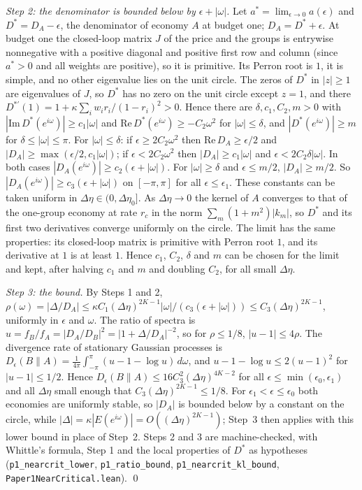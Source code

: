 \documentclass[12pt]{article}
\theoremstyle{definition}
\theoremstyle{remark}
\begin{document}
\emph{Step 2: the denominator is bounded below by $\epsilon+|\omega|$.} Let $a^*=\lim_{\epsilon\to0}a(\epsilon)$ and $D^*=D_A-\epsilon$, the denominator of economy $A$ at budget one; $D_A=D^*+\epsilon$. At budget one the closed-loop matrix $J$ of the price and the groups is entrywise nonnegative with a positive diagonal and positive first row and column (since $a^*>0$ and all weights are positive), so it is primitive. Its Perron root is $1$, it is simple, and no other eigenvalue lies on the unit circle. The zeros of $D^*$ in $|z|\ge1$ are eigenvalues of $J$, so $D^*$ has no zero on the unit circle except $z=1$, and there $D^{*\prime}(1)=1+\kappa\sum_iw_ir_i/(1-r_i)^2>0$. Hence there are $\delta,c_1,C_2,m>0$ with $|\mathrm{Im}\,D^*(e^{i\omega})|\ge c_1|\omega|$ and $\mathrm{Re}\,D^*(e^{i\omega})\ge-C_2\omega^2$ for $|\omega|\le\delta$, and $|D^*(e^{i\omega})|\ge m$ for $\delta\le|\omega|\le\pi$. For $|\omega|\le\delta$: if $\epsilon\ge2C_2\omega^2$ then $\mathrm{Re}\,D_A\ge\epsilon/2$ and $|D_A|\ge\max(\epsilon/2,c_1|\omega|)$; if $\epsilon<2C_2\omega^2$ then $|D_A|\ge c_1|\omega|$ and $\epsilon<2C_2\delta|\omega|$. In both cases $|D_A(e^{i\omega})|\ge c_2(\epsilon+|\omega|)$. For $|\omega|\ge\delta$ and $\epsilon\le m/2$, $|D_A|\ge m/2$. So $|D_A(e^{i\omega})|\ge c_3(\epsilon+|\omega|)$ on $[-\pi,\pi]$ for all $\epsilon\le\epsilon_1$. These constants can be taken uniform in $\Delta\eta\in(0,\Delta\eta_0]$. As $\Delta\eta\to0$ the kernel of $A$ converges to that of the one-group economy at rate $r_c$ in the norm $\sum_m(1+m^2)|k_m|$, so $D^*$ and its first two derivatives converge uniformly on the circle. The limit has the same properties: its closed-loop matrix is primitive with Perron root $1$, and its derivative at $1$ is at least $1$. Hence $c_1$, $C_2$, $\delta$ and $m$ can be chosen for the limit and kept, after halving $c_1$ and $m$ and doubling $C_2$, for all small $\Delta\eta$.

\emph{Step 3: the bound.} By Steps 1 and 2, $\rho(\omega)=|\Delta/D_A|\le\kappa C_1(\Delta\eta)^{2K-1}|\omega|/(c_3(\epsilon+|\omega|))\le C_3(\Delta\eta)^{2K-1}$, uniformly in $\epsilon$ and $\omega$. The ratio of spectra is $u=f_B/f_A=|D_A/D_B|^2=|1+\Delta/D_A|^{-2}$, so for $\rho\le1/8$, $|u-1|\le4\rho$. The divergence rate of stationary Gaussian processes is $D_\epsilon(B\|A)=\frac1{4\pi}\int_{-\pi}^{\pi}(u-1-\log u)\,d\omega$, and $u-1-\log u\le2(u-1)^2$ for $|u-1|\le1/2$. Hence $D_\epsilon(B\|A)\le16C_3^2(\Delta\eta)^{4K-2}$ for all $\epsilon\le\min(\epsilon_0,\epsilon_1)$ and all $\Delta\eta$ small enough that $C_3(\Delta\eta)^{2K-1}\le1/8$. For $\epsilon_1<\epsilon\le\epsilon_0$ both economies are uniformly stable, so $|D_A|$ is bounded below by a constant on the circle, while $|\Delta|=\kappa|E(e^{i\omega})|=O((\Delta\eta)^{2K-1})$; Step~3 then applies with this lower bound in place of Step~2. Steps 2 and 3 are machine-checked, with Whittle's formula, Step 1 and the local properties of $D^*$ as hypotheses (\texttt{p1\_nearcrit\_lower}, \texttt{p1\_ratio\_bound}, \texttt{p1\_nearcrit\_kl\_bound}, \nolinkurl{Paper1NearCritical.lean}). \qed
\end{document}
